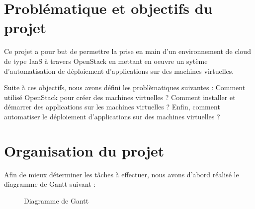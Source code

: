 \documentclass{report}
\begin{document}
    \section{Problématique et objectifs du projet}
        
        Ce projet a pour but de permettre la prise en main d'un environnement de cloud de type IaaS à travers OpenStack en mettant en oeuvre un sytème d'automatisation de déploiement d'applications sur des machines virtuelles.\bigbreak
        
        Suite à ces objectifs, nous avons défini les problèmatiques suivantes :\newline
        Comment utilisé OpenStack pour créer des machines virtuelles ?\newline
        Comment installer et démarrer des applications sur les machines virtuelles ?\newline
        Enfin, comment automatiser le déploiement d'applications sur des machines virtuelles ?


	\section{Organisation du projet}
	
    	Afin de mieux déterminer les tâches à effectuer, nous avons d'abord réalisé le diagramme de Gantt suivant :
    	
    	\begin{figure}[H]
            \caption{Diagramme de Gantt}
        \end{figure}
    	\bigbreak
    
\end{document}

